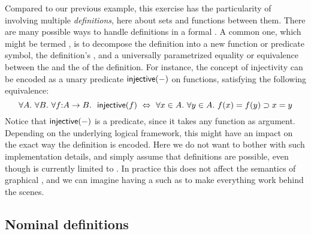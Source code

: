 \AP
Compared to our previous example, this exercise has the particularity of
involving multiple \emph{definitions}, here about sets and functions between
them. There are many possible ways to handle definitions in a formal . A common one, which might be termed , is to decompose
the definition into a new function or predicate symbol, the definition's
, and a universally parametrized equality or equivalence between the
 and the  of the definition. For instance, the concept of
injectivity can be encoded as a unary predicate $\mbox{\textsf{injective}}(-)$ on
functions, satisfying the following equivalence:
$$\forall A.\ \forall B.\ \forall f{:}A \to B.~\ \mbox{\textsf{injective}}(f) ~\Leftrightarrow~ \forall x
\in A.\ \forall y \in A.\ f(x) = f(y) \supset x = y$$
Notice that $\mbox{\textsf{injective}}(-)$ is a \emph{} predicate, since it
takes any function as argument. Depending on the underlying logical framework,
this might have an impact on the exact way the definition is encoded. Here we do
not want to bother with such implementation details, and simply assume that
 definitions are possible, even though  is currently limited
to . In practice this does not affect the semantics of
graphical , and we can imagine having a   such as
 to make everything work behind the scenes.

\subsection{Nominal definitions}

